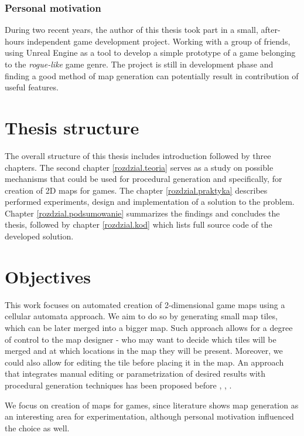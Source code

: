 \documentclass[12pt]{report}
\begin{document}
\subsubsection{Personal motivation}
During two recent years, the author of this thesis took part in a small, after-hours independent game development project. Working with a group of friends, using Unreal Engine as a tool to develop a simple prototype of a game belonging to the \textit{rogue-like} game genre. The project is still in development phase and finding a good method of map generation can potentially result in contribution of useful features.

\section{Thesis structure}
The overall structure of this thesis includes introduction followed by three chapters. The second chapter \ref{rozdzial.teoria} serves as a study on possible mechanisms that could be used for procedural generation and specifically, for creation of 2D maps for games. The chapter \ref{rozdzial.praktyka} describes performed experiments, design and implementation of a solution to the problem. Chapter \ref{rozdzial.podsumowanie} summarizes the findings and concludes the thesis, followed by chapter \ref{rozdzial.kod} which lists full source code of the developed solution.

\section{Objectives}

This work focuses on automated creation of 2-dimensional game maps using a cellular automata approach. We aim to do so by generating small map tiles, which can be later merged into a bigger map. Such approach allows for a degree of control to the map designer - who may want to decide which tiles will be merged and at which locations in the map they will be present. Moreover, we could also allow for editing the tile before placing it in the map. An approach that integrates manual editing or parametrization of desired results with procedural generation techniques has been proposed before \autocite{bidarra2010integrating}, \autocite{smelik2010integrating}, \autocite{smelik2011declarative}.

We focus on creation of maps for games, since literature shows map generation as an interesting area for experimentation, although personal motivation influenced the choice as well.
\end{document}
